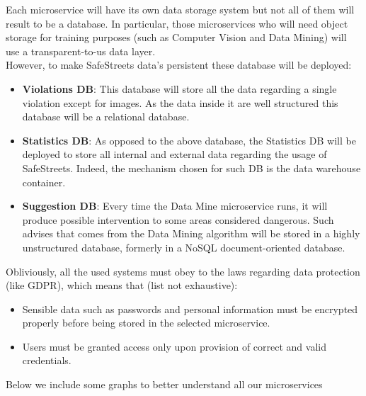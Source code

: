 Each microservice will have its own data storage system but not all of them will result to be a database. In particular, those microservices who will need object storage for training purposes (such as Computer Vision and Data Mining) will use a transparent-to-us data layer.\\
However, to make SafeStreets data's persistent these database will be deployed:
\begin{itemize}
	\item \textbf{Violations DB}: This database will store all the data regarding a single violation except for images. As the data inside it are well structured this database will be a relational database.
	\item \textbf{Statistics DB}: As opposed to the above database, the Statistics DB will be deployed to store all internal and external data regarding the usage of SafeStreets. Indeed, the mechanism chosen for such DB is the data warehouse container.
	\item \textbf{Suggestion DB}: Every time the Data Mine microservice runs, it will produce possible intervention to some areas considered dangerous. Such advises that comes from the Data Mining algorithm will be stored in a highly unstructured database, formerly in a NoSQL document-oriented database.
\end{itemize}
Obliviously, all the used systems must obey to the laws regarding data protection (like GDPR), which means that (list not exhaustive):
\begin{itemize}
\item Sensible data such as passwords and personal information must be encrypted properly before being stored in the selected microservice.
\item Users must be granted access only upon provision of correct and valid credentials.
\end{itemize}

Below we include some graphs to better understand all our microservices